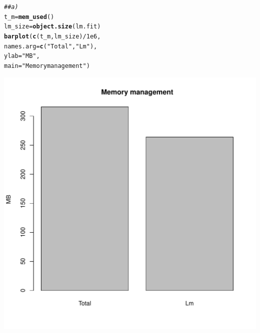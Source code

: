 \documentclass{llncs}\usepackage[]{graphicx}\usepackage[]{color}
\makeatletter
\def\maxwidth{ %
  \ifdim\Gin@nat@width>\linewidth
    \linewidth
  \else
    \Gin@nat@width
  \fi
}
\newcommand{\hlnum}[1]{\textcolor[rgb]{0.686,0.059,0.569}{#1}}%
\newcommand{\hlstr}[1]{\textcolor[rgb]{0.192,0.494,0.8}{#1}}%
\newcommand{\hlcom}[1]{\textcolor[rgb]{0.678,0.584,0.686}{\textit{#1}}}%
\newcommand{\hlopt}[1]{\textcolor[rgb]{0,0,0}{#1}}%
\newcommand{\hlstd}[1]{\textcolor[rgb]{0.345,0.345,0.345}{#1}}%
\newcommand{\hlkwb}[1]{\textcolor[rgb]{0.69,0.353,0.396}{#1}}%
\newcommand{\hlkwc}[1]{\textcolor[rgb]{0.333,0.667,0.333}{#1}}%
\newcommand{\hlkwd}[1]{\textcolor[rgb]{0.737,0.353,0.396}{\textbf{#1}}}%
\newenvironment{kframe}{%
 \def\at@end@of@kframe{}%
 \ifinner\ifhmode%
  \def\at@end@of@kframe{\end{minipage}}%
  \begin{minipage}{\columnwidth}%
 \fi\fi%
 \def\FrameCommand##1{\hskip\@totalleftmargin \hskip-\fboxsep
 \colorbox{shadecolor}{##1}\hskip-\fboxsep
     \hskip-\linewidth \hskip-\@totalleftmargin \hskip\columnwidth}%
 \MakeFramed {\advance\hsize-\width
   \@totalleftmargin\z@ \linewidth\hsize
   \@setminipage}}%
 {\par\unskip\endMakeFramed%
 \at@end@of@kframe}
\newenvironment{knitrout}{}{} %
\makeatother
\begin{document}
\begin{knitrout}
\color{fgcolor}\begin{kframe}
\begin{alltt}
\hlcom{## a)}
\hlstd{t_m}\hlkwb{=}\hlkwd{mem_used}\hlstd{()}
\hlstd{lm_size}\hlkwb{=}\hlkwd{object.size}\hlstd{(lm.fit)}
\hlkwd{barplot}\hlstd{(}\hlkwd{c}\hlstd{(t_m,lm_size)}\hlopt{/}\hlnum{1e6}\hlstd{,}
        \hlkwc{names.arg}\hlstd{=}\hlkwd{c}\hlstd{(}\hlstr{"Total"}\hlstd{,}\hlstr{"Lm"}\hlstd{),}
        \hlkwc{ylab}\hlstd{=}\hlstr{"MB"}\hlstd{,}
        \hlkwc{main}\hlstd{=}\hlstr{"Memory management"}\hlstd{)}
\end{alltt}
\end{kframe}
\includegraphics[width=\maxwidth]{figure/unnamed-chunk-20-1} 

\end{knitrout}
\end{document}
